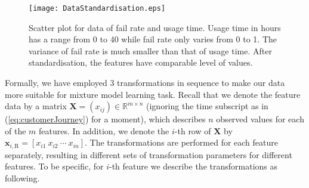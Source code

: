 \begin{figure}[!h]
\centering
\texttt{[image: DataStandardisation.eps]}
\caption{Scatter plot for data of fail rate and usage time. Usage time in hours has a range from 0 to 40 while fail rate only varies from 0 to 1. The variance of fail rate is much smaller than that of usage time. After standardisation, the features have comparable level of values.}
\label{fig:dataStandardisation}
\end{figure}

Formally, we have employed 3 transformations in sequence to make our data more suitable for mixture model learning task. Recall that we denote the feature data by a matrix $\mathbf{X} = (x_{ij}) \in \mathbb{R}^{m \times n}$ (ignoring the time subscript as in (\ref{eq:customerJourney}) for a moment), which describes $n$ observed values for each of the $m$ features. In addition, we denote the $i$-th row of $\mathbf{X}$ by $\mathbf{x}_{i,\text{R}} = [x_{i1} ~x_{i2} ~\cdots ~x_{in}]$. The transformations are performed for each feature separately, resulting in different sets of transformation parameters for different features. To be specific, for $i$-th feature we describe the transformations as following.

